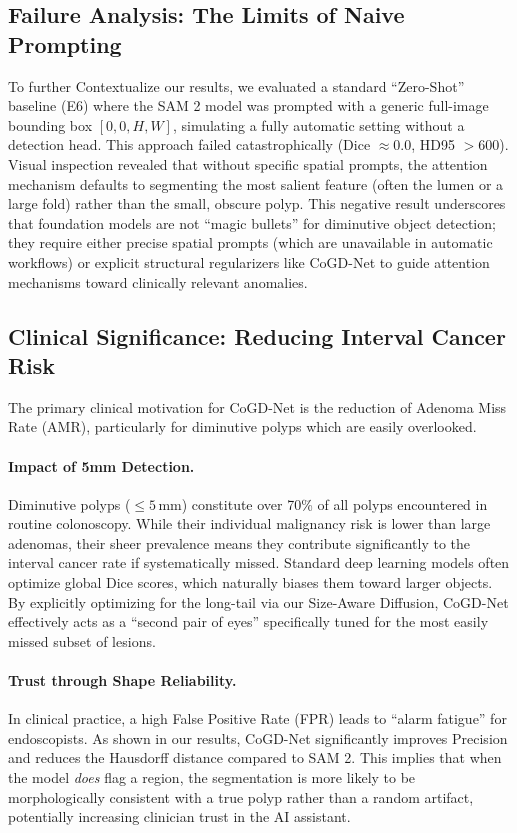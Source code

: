 \documentclass{article}
\begin{document}
\subsection{Failure Analysis: The Limits of Naive Prompting}
To further Contextualize our results, we evaluated a standard ``Zero-Shot'' baseline (E6) where the SAM 2 model was prompted with a generic full-image bounding box $[0, 0, H, W]$, simulating a fully automatic setting without a detection head.
This approach failed catastrophically (Dice $\approx 0.0$, HD95 $> 600$).
Visual inspection revealed that without specific spatial prompts, the attention mechanism defaults to segmenting the most salient feature (often the lumen or a large fold) rather than the small, obscure polyp.
This negative result underscores that foundation models are not ``magic bullets'' for diminutive object detection; they require either precise spatial prompts (which are unavailable in automatic workflows) or explicit structural regularizers like CoGD-Net to guide attention mechanisms toward clinically relevant anomalies.

\subsection{Clinical Significance: Reducing Interval Cancer Risk}
The primary clinical motivation for CoGD-Net is the reduction of Adenoma Miss Rate (AMR), particularly for diminutive polyps which are easily overlooked.
\paragraph{Impact of 5mm Detection.}
Diminutive polyps ($\leq 5$\,mm) constitute over 70\% of all polyps encountered in routine colonoscopy. While their individual malignancy risk is lower than large adenomas, their sheer prevalence means they contribute significantly to the interval cancer rate if systematically missed. Standard deep learning models often optimize global Dice scores, which naturally biases them toward larger objects. By explicitly optimizing for the long-tail via our Size-Aware Diffusion, CoGD-Net effectively acts as a ``second pair of eyes'' specifically tuned for the most easily missed subset of lesions.
\paragraph{Trust through Shape Reliability.}
In clinical practice, a high False Positive Rate (FPR) leads to ``alarm fatigue'' for endoscopists. As shown in our results, CoGD-Net significantly improves Precision and reduces the Hausdorff distance compared to SAM 2. This implies that when the model \emph{does} flag a region, the segmentation is more likely to be morphologically consistent with a true polyp rather than a random artifact, potentially increasing clinician trust in the AI assistant.
\end{document}
